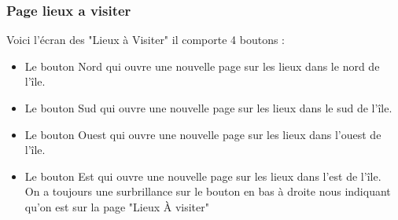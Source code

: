 \documentclass{article}
\begin{document}
\begin{minipage}{0.5\textwidth}
\subsubsection{\color{purple}Page lieux a visiter}
Voici l'écran des "Lieux à Visiter" il comporte 4 boutons :
\begin{itemize}
 \item Le bouton Nord qui ouvre une nouvelle page sur les lieux dans le nord de l'île.
 \item Le bouton Sud qui ouvre une nouvelle page sur les lieux dans le sud de l'île.
 \item Le bouton Ouest qui ouvre une nouvelle page sur les lieux dans l'ouest de l'île.
 \item Le bouton Est qui ouvre une nouvelle page sur les lieux dans l'est de l'île.
 \\ On a toujours une surbrillance sur le bouton en bas à droite nous indiquant qu'on est sur la page "Lieux À visiter"
\end{itemize}
\end{minipage}
\hfill
\end{document}
